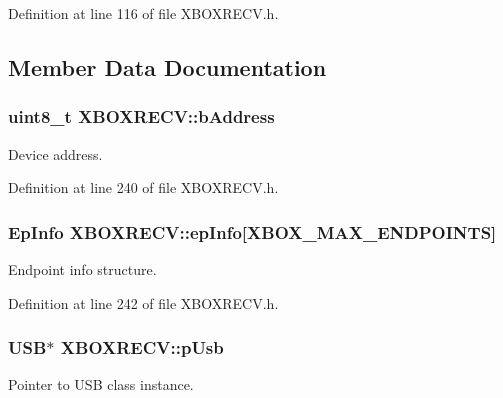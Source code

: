 \-Definition at line 116 of file \-X\-B\-O\-X\-R\-E\-C\-V.\-h.



\subsection{\-Member \-Data \-Documentation}
\hypertarget{class_x_b_o_x_r_e_c_v_a1d4bdb1b740c87fd51aca3969e67c730}{
\subsubsection[{b\-Address}]{\setlength{\rightskip}{0pt plus 5cm}uint8\-\_\-t {\bf \-X\-B\-O\-X\-R\-E\-C\-V\-::b\-Address}}}\label{class_x_b_o_x_r_e_c_v_a1d4bdb1b740c87fd51aca3969e67c730}
\-Device address. 

\-Definition at line 240 of file \-X\-B\-O\-X\-R\-E\-C\-V.\-h.

\hypertarget{class_x_b_o_x_r_e_c_v_af97c8d0efc945fa4ba1d120c8a5a9cbb}{
\subsubsection[{ep\-Info}]{\setlength{\rightskip}{0pt plus 5cm}\-Ep\-Info {\bf \-X\-B\-O\-X\-R\-E\-C\-V\-::ep\-Info}\mbox{[}{\bf \-X\-B\-O\-X\-\_\-\-M\-A\-X\-\_\-\-E\-N\-D\-P\-O\-I\-N\-T\-S}\mbox{]}}}\label{class_x_b_o_x_r_e_c_v_af97c8d0efc945fa4ba1d120c8a5a9cbb}
\-Endpoint info structure. 

\-Definition at line 242 of file \-X\-B\-O\-X\-R\-E\-C\-V.\-h.

\hypertarget{class_x_b_o_x_r_e_c_v_a53047c86c8c2f625916af62238d50fc8}{
\subsubsection[{p\-Usb}]{\setlength{\rightskip}{0pt plus 5cm}\-U\-S\-B$\ast$ {\bf \-X\-B\-O\-X\-R\-E\-C\-V\-::p\-Usb}}}\label{class_x_b_o_x_r_e_c_v_a53047c86c8c2f625916af62238d50fc8}
\-Pointer to \-U\-S\-B class instance. 

